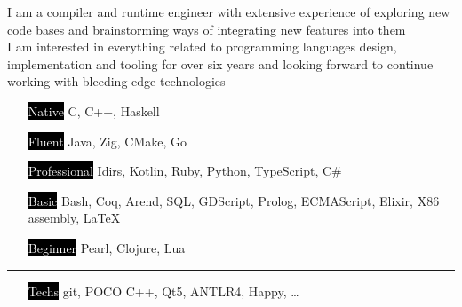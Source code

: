 \documentclass[9pt]{template/developercv} %
\begin{document}
\begin{minipage}[t]{0.4\textwidth}
	\vspace{-\baselineskip}

	I am a compiler and runtime engineer with extensive experience of exploring new code bases and brainstorming ways of integrating new features into them\\
	I am interested in everything related to programming languages design, implementation and tooling for over six years and looking forward to continue working with bleeding edge technologies
\end{minipage}
\hfill
\begin{minipage}[t]{0.5\textwidth}
	\vspace{-\baselineskip}
	\vspace{-0.5\baselineskip}

	\begin{itemize}
		\setlength{\itemsep}{0pt}
		\setlength{\parskip}{0.0\baselineskip}
    \setlength{\parsep}{0pt}
		\item[\colorbox{black}{\textcolor{white}{Native}}] C, C++, Haskell
		\item[\colorbox{black}{\textcolor{white}{Fluent}}] Java, Zig, CMake, Go
		\item[\colorbox{black}{\textcolor{white}{Professional}}] Idirs, Kotlin, Ruby, Python, TypeScript, C\#
		\item[\colorbox{black}{\textcolor{white}{Basic}}] Bash, Coq, Arend, SQL, GDScript, Prolog, ECMAScript, Elixir, X86 assembly, \LaTeX
		\item[\colorbox{black}{\textcolor{white}{Beginner}}] Pearl, Clojure, Lua
	\end{itemize}
	\vspace{-0.5\baselineskip}
	\noindent\hspace{-0.1\textwidth}\rule{1.1\textwidth}{0.4pt}
	\begin{itemize}
		\setlength{\itemsep}{0pt}
		\setlength{\parskip}{0.0\baselineskip}
    \setlength{\parsep}{0pt}
		\item[\colorbox{black}{\textcolor{white}{Techs}}] git, POCO C++, Qt5, ANTLR4, Happy, \dots
	\end{itemize}
\end{minipage}

\end{document}
